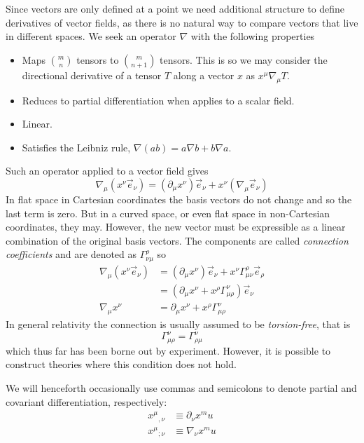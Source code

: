 Since vectors are only defined at a point we need additional structure
to define derivatives of vector fields, as there is no natural way to
compare vectors that live in different spaces.  We seek an operator
$\nabla$ with the following properties
%
\begin{itemize}
\item Maps ${m \choose n}$ tensors to ${m \choose {n+1}}$ tensors.
This is so we may consider the directional derivative of a tensor $T$
along a vector $x$ as $x^\mu \nabla_\mu T$.
\item Reduces to partial differentiation when applies to a scalar
field.
\item Linear.
\item Satisfies the Leibniz rule, $\nabla(a b) = a\nabla b + b \nabla a$.
\end{itemize}
%
Such an operator applied to a vector field gives
%
\begin{equation*}
\nabla_\mu (x^\nu \vec{e}_\nu)
= (\partial_\mu x^\nu) \vec{e}_\nu + x^\nu (\nabla_\mu
\vec{e}_\nu)
\end{equation*}
%
In flat space in Cartesian coordinates the basis vectors do not
change and so the last term is zero.  But in a curved space, or even
flat space in non-Cartesian coordinates, they may.  However, the new
vector must be expressible as a linear combination of the original
basis vectors.  The components are called \emph{connection
coefficients} and are denoted as $\Gamma^\rho_{\nu\mu}$ so
%
\begin{align}
\label{eq:covariant_derivative}
\nabla_\mu (x^\nu \vec{e}_\nu) &= 
(\partial_\mu x^\nu) \vec{e}_\nu + 
x^\nu \Gamma^\rho_{\mu\nu} \vec{e}_\rho \\
&= (\partial_\mu x^\nu + x^\rho \Gamma^\nu_{\mu\rho}) \vec{e}_\nu \\
\nabla_\mu x^\nu &= \partial_\mu x^\nu + x^\rho \Gamma^\nu_{\mu\rho}
\end{align}
%
In general relativity the connection is usually assumed to be
\emph{torsion-free}, that is
%
\begin{equation}
\label{eq:torsion}
 \Gamma^\nu_{\mu\rho} =  \Gamma^\nu_{\rho\mu}
\end{equation}
%
which thus far has been borne out by experiment.  However, it is
possible to construct theories where this condition does not hold.

We will henceforth occasionally use commas and semicolons to denote
partial and covariant differentiation, respectively:
%
\begin{align*}
{x^\mu}_{,\nu} &\equiv \partial_\nu x^mu \\
{x^\mu}_{;\nu} &\equiv \nabla_\nu x^mu \\
\end{align*}


